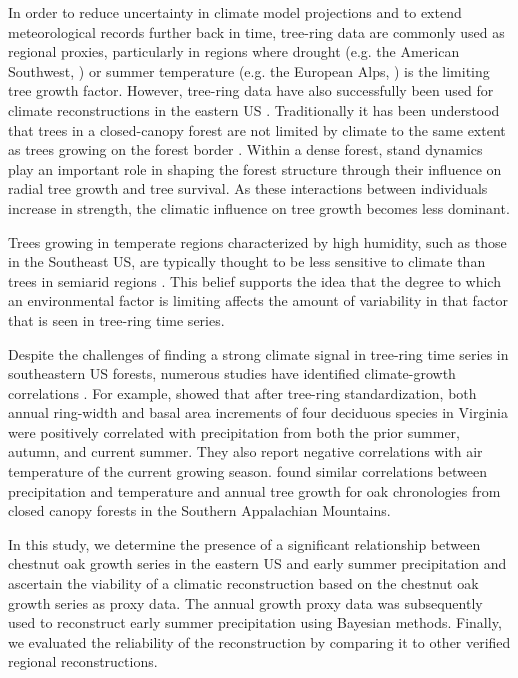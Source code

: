 In order to reduce uncertainty in climate model projections and to
extend meteorological records further back in time, tree-ring data are
commonly used as regional proxies, particularly in regions where drought
(e.g. the American Southwest, \cite{cook2004long}) or summer temperature
(e.g. the European Alps, \cite{buntgen2007growth}) is the limiting tree
growth factor. However, tree-ring data have also successfully been used
for climate reconstructions in the eastern US \cite{leblanc1993temporal,
stahle1993, cook1999drought}. Traditionally it has been understood that
trees in a closed-canopy forest are not limited by climate to the same
extent as trees growing on the forest border \cite{fritts1976tree}. Within
a dense forest, stand dynamics play an important role in shaping the
forest structure through their influence on radial tree growth and tree
survival. As these interactions between individuals increase in strength,
the climatic influence on tree growth becomes less dominant.

Trees growing in temperate regions characterized by high humidity, such
as those in the Southeast US, are typically thought to be less sensitive
to climate than trees in semiarid regions \cite{phipps1982comments}. This
belief supports the idea that the degree to which an environmental factor
is limiting affects the amount of variability in that factor that is
seen in tree-ring time series.

Despite the challenges of finding a strong climate signal in tree-ring
time series in southeastern US forests, numerous studies have identified
climate-growth correlations \cite{pan1997dendroclimatological,
speer2009climate, rubino2000dendroclimatological}. For example,
\citet{pan1997dendroclimatological} showed that after tree-ring
standardization, both annual ring-width and basal area increments
of four deciduous species in Virginia were positively correlated
with precipitation from both the prior summer, autumn, and current
summer. They also report negative correlations with air temperature
of the current growing season. \citet{speer2009climate}
found similar correlations between precipitation and temperature and
annual tree growth for oak chronologies from closed canopy forests in
the Southern Appalachian Mountains.

In this study, we determine the presence of a significant relationship
between chestnut oak growth series in the eastern US and early summer
precipitation and ascertain the viability of a climatic reconstruction
based on the chestnut oak growth series as proxy data. The annual growth
proxy data was subsequently used to reconstruct early summer precipitation
using Bayesian methods. Finally, we evaluated the reliability of the
reconstruction by comparing it to other verified regional reconstructions.

